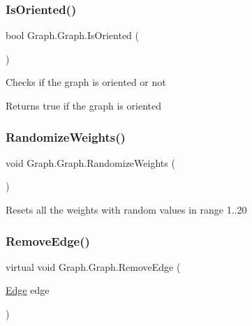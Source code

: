 \subsubsection{\texorpdfstring{Is\+Oriented()}{IsOriented()}}
{\footnotesize\ttfamily bool Graph.\+Graph.\+Is\+Oriented (\begin{DoxyParamCaption}{ }\end{DoxyParamCaption})}



Checks if the graph is oriented or not 

\begin{DoxyReturn}{Returns}
true if the graph is oriented
\end{DoxyReturn}
\mbox{\label{class_graph_1_1_graph_a4c16783a84526b65e8447f7061b38140}} 
\subsubsection{\texorpdfstring{Randomize\+Weights()}{RandomizeWeights()}}
{\footnotesize\ttfamily void Graph.\+Graph.\+Randomize\+Weights (\begin{DoxyParamCaption}{ }\end{DoxyParamCaption})}



Resets all the weights with random values in range 1..20 

\mbox{\label{class_graph_1_1_graph_a0b49bbae104d612158d6bbef9083d453}} 
\subsubsection{\texorpdfstring{Remove\+Edge()}{RemoveEdge()}}
{\footnotesize\ttfamily virtual void Graph.\+Graph.\+Remove\+Edge (\begin{DoxyParamCaption}\item[{\hyperlink{class_graph_1_1_edge}{Edge}}]{edge }\end{DoxyParamCaption})\hspace{0.3cm}{\ttfamily [virtual]}}



